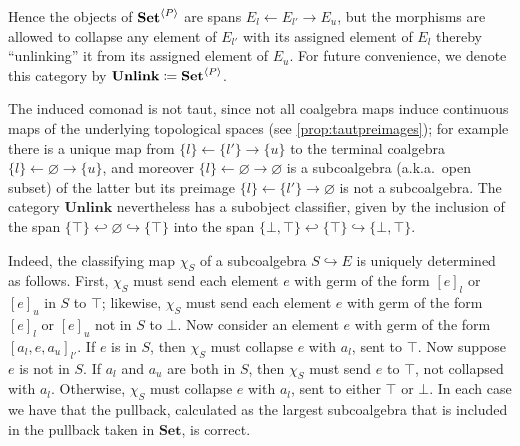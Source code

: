 \documentclass[11pt, oneside, article]{memoir}
\theoremstyle{plain}
\theoremstyle{definition}
\theoremstyle{remark}
\newenvironment{counterexample}
{\renewcommand\qedsymbol{$\lrcorner$}%
  \pushQED{\qed}\mycounterexample}
{\popQED\endmycounterexample}
\DeclarePairedDelimiter{\gen}{\langle}{\rangle}
\newcommand{\ot}{\leftarrow}
\newcommand{\namedcat}[1]{\mathbf{#1}}
\newcommand{\cat}[1]{\mathbf{#1}}
\newcommand{\Set}{\namedcat{Set}}
\newcommand{\Unlink}{\namedcat{Unlink}}
\newcommand{\CoalgOn}[2]{{#2}^{#1}}
\newcommand{\CoalgSet}[1]{\CoalgOn{#1}{\Set}}
\newcommand{\ph}[1]{#1}
\newcommand{\setof}[1]{\{#1\}}
\newcommand{\eE}{E}
\newcommand{\eS}{S}
\newcommand{\xA}{A}
\newcommand{\bC}{\cat{C}}
\newcommand{\pP}{\ph{P}}
\newcommand{\cP}{\gen{\pP}}
\newcommand{\PSet}{\CoalgSet{\cP}}
\begin{document}
\begin{counterexample}[Non-taut subobject classifier]


  Hence the objects of $\PSet$ are spans
  $\eE_l \ot \eE_{l'} \to \eE_u$, but the morphisms are allowed to
  collapse any element of $\eE_{l'}$ with its assigned element of
  $\eE_l$ thereby ``unlinking'' it from its assigned element of
  $\eE_u$. For future convenience, we denote this category by
  $\Unlink \coloneqq \PSet$.
  
  The induced comonad is not taut, since not all coalgebra maps induce
  continuous maps of the underlying topological spaces (see
  \cref{prop:tautpreimages}); for example there is a unique map from
  $\setof{l} \ot \setof{l'} \to \setof{u}$ to the terminal coalgebra
  $\setof{l} \ot \varnothing \to \setof{u}$, and moreover
  $\setof{l} \ot \varnothing \to \varnothing$ is a subcoalgebra
  (a.k.a.\ open subset) of the latter but its preimage
  $\setof{l} \ot \setof{l'} \to \varnothing$ is not a
  subcoalgebra. The category $\Unlink$ nevertheless has a subobject
  classifier, given by the inclusion of the span
  $\setof{\top} \hookleftarrow \varnothing \hookrightarrow
  \setof{\top}$ into the span
  $\setof{\bot, \top} \hookleftarrow \setof{\top} \hookrightarrow
  \setof{\bot, \top}$.

  Indeed, the classifying map $\chi_\eS$ of a subcoalgebra
  $\eS\hookrightarrow\eE$ is uniquely determined as follows. First,
  $\chi_\eS$ must send each element $e$ with germ of the form $[e]_l$
  or $[e]_u$ in $\eS$ to $\top$; likewise, $\chi_\eS$ must send each
  element $e$ with germ of the form $[e]_l$ or $[e]_u$ not in $\eS$ to
  $\bot$. Now consider an element $e$ with germ of the form
  $[a_l, e, a_u]_{l'}$. If $e$ is in $\eS$, then $\chi_\eS$ must
  collapse $e$ with $a_l$, sent to $\top$. Now suppose $e$ is not in
  $\eS$. If $a_l$ and $a_u$ are both in $\eS$, then $\chi_\eS$ must
  send $e$ to $\top$, not collapsed with $a_l$. Otherwise, $\chi_\eS$
  must collapse $e$ with $a_l$, sent to either $\top$ or $\bot$. In
  each case we have that the pullback, calculated as the largest
  subcoalgebra that is included in the pullback taken in $\Set$, is
  correct.


\end{counterexample}
\end{document}
